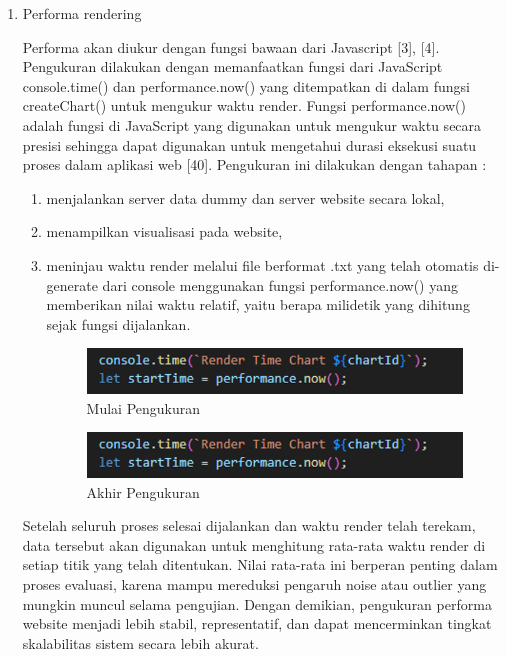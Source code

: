 \begin{enumerate}
	\item Performa rendering

	Performa akan diukur dengan fungsi bawaan dari Javascript [3], [4]. Pengukuran dilakukan dengan memanfaatkan fungsi dari JavaScript console.time() dan performance.now() yang ditempatkan di dalam fungsi createChart() untuk mengukur waktu render. Fungsi performance.now() adalah fungsi di JavaScript yang digunakan untuk mengukur waktu secara presisi sehingga dapat digunakan untuk mengetahui durasi eksekusi suatu proses dalam aplikasi web [40]. Pengukuran ini dilakukan dengan tahapan : 
	\begin{enumerate}[label={\arabic*.}]
		\item menjalankan server data dummy dan server website secara lokal,
		\item menampilkan visualisasi pada website, 
		\item meninjau waktu render melalui file berformat .txt yang telah otomatis di-generate dari console menggunakan fungsi performance.now() yang memberikan nilai waktu relatif, yaitu berapa milidetik yang dihitung sejak fungsi dijalankan. 
			\begin{figure}[H]
			\centering
			\includegraphics[width=0.8\linewidth]{gambar/Metodologi/Start Performance Now.png}
			\caption{Mulai Pengukuran}
			\label{Mulai Pengukuran Render}
		\end{figure}
			\begin{figure}[H]
			\centering
			\includegraphics[width=0.8\linewidth]{gambar/Metodologi/Start Performance Now.png}
			\caption{Akhir Pengukuran}
			\label{Akhir Pengukuran Render}
		\end{figure}
	\end{enumerate}
			Setelah seluruh proses selesai dijalankan dan waktu render telah terekam, data tersebut akan digunakan untuk menghitung rata-rata waktu render di setiap titik yang telah ditentukan. Nilai rata-rata ini berperan penting dalam proses evaluasi, karena mampu mereduksi pengaruh noise atau outlier yang mungkin muncul selama pengujian. Dengan demikian, pengukuran performa website menjadi lebih stabil, representatif, dan dapat mencerminkan tingkat skalabilitas sistem secara lebih akurat.
	

\end{enumerate}
